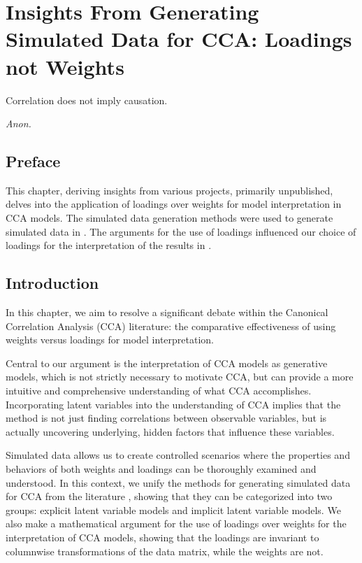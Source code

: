 \graphicspath{{chapters/loadings/}}


\chapter{Insights From Generating Simulated Data for CCA: Loadings not Weights}\label{chap:loadings}
\epigraph{Correlation does not imply causation.}{\textit{Anon.}}
\minitoc
\section*{Preface}

This chapter, deriving insights from various projects, primarily unpublished, delves into the application of loadings over weights for model interpretation in CCA models. The simulated data generation methods were used to generate simulated data in \citet{mihalik2022canonical}. The arguments for the use of loadings influenced our choice of loadings for the interpretation of the results in \citet{}.

\section{Introduction}

In this chapter, we aim to resolve a significant debate within the Canonical Correlation Analysis (CCA) literature: the comparative effectiveness of using weights versus loadings for model interpretation\citep{gu2018simultaneous}.

Central to our argument is the interpretation of CCA models as generative models, which is not strictly necessary to motivate CCA, but can provide a more intuitive and comprehensive understanding of what CCA accomplishes.
Incorporating latent variables into the understanding of CCA implies that the method is not just finding correlations between observable variables, but is actually uncovering underlying, hidden factors that influence these variables.

Simulated data allows us to create controlled scenarios where the properties and behaviors of both weights and loadings can be thoroughly examined and understood.
In this context, we unify the methods for generating simulated data for CCA from the literature \citep{chen2013sparse, suo2017sparse, helmer2020stability}, showing that they can be categorized into two groups: explicit latent variable models and implicit latent variable models.
We also make a mathematical argument for the use of loadings over weights for the interpretation of CCA models, showing that the loadings are invariant to columnwise transformations of the data matrix, while the weights are not.

